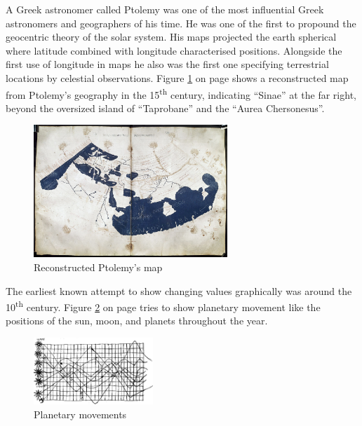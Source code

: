 A Greek astronomer called Ptolemy was one of the most influential Greek astronomers and geographers of his time. He was one of the first to propound the geocentric theory of the solar system. His maps projected the earth spherical where latitude combined with longitude characterised positions. Alongside the first use of longitude in maps he also was the first one specifying terrestrial locations by celestial observations. Figure \ref{fig:ptolemy} on page \pageref{fig:ptolemy} shows a reconstructed map from Ptolemy's geography in the 15\textsuperscript{th} century, indicating ``Sinae'' at the far right, beyond the oversized island of ``Taprobane'' and the ``Aurea Chersonesus''.

\begin{figure}[!htb]
\centering
\includegraphics[height=5cm,keepaspectratio]{images/history/ptolemy-map.jpg}
\caption[
    Reconstructed Ptolemy's map, Urldate: 07.2016 \newline
\small\texttt{\url{https://upload.wikimedia.org/wikipedia/commons/2/23/PtolemyWorldMap.jpg}}
]{Reconstructed Ptolemy's map}
\label{fig:ptolemy}
\end{figure}

The earliest known attempt to show changing values graphically was around the 10\textsuperscript{th} century. Figure \ref{fig:planetary-movement} on page \pageref{fig:planetary-movement} tries to show planetary movement like the positions of the sun, moon, and planets throughout the year.

\begin{figure}[!htb]
\centering
\includegraphics[width=0.4\textwidth,keepaspectratio]{images/history/planetary-movement.jpg}
\caption[
    Planetary movements, Urldate: 07.2016 \newline
\small\texttt{\url{http://www.fi.uu.nl/wiskrant/artikelen/hist_grafieken/begin/images/planeten.gif}}
]{Planetary movements}
\label{fig:planetary-movement}
\end{figure}

